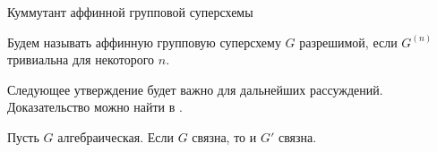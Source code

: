 \begin{subsection}{Куммутант аффинной групповой суперсхемы}
  \begin{definition}
    Будем называть аффинную групповую суперсхему $ G $ разрешимой,
    если $ G^{(n)} $ тривиальна для некоторого $ n $.
  \end{definition}

  Следующее утверждение будет важно для дальнейших рассуждений.
  Доказательство можно найти в \cite{waterhouse}.
  \begin{theorem}\label{derived connected}
    Пусть $ G $ алгебраическая. Если $ G $ связна, то и $ G' $ связна.
  \end{theorem}

\end{subsection}
